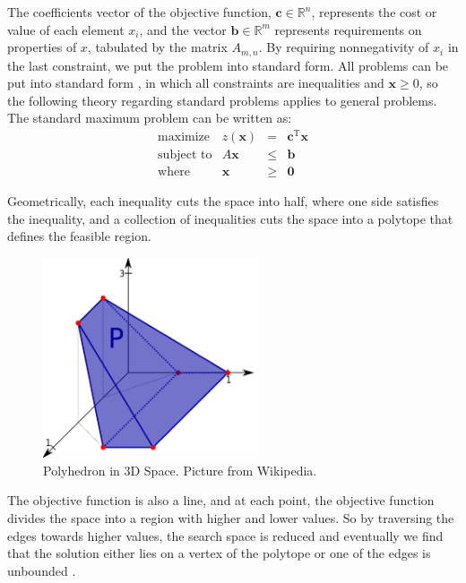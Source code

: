\documentclass[12pt]{article}
\begin{document}
The coefficients vector of the objective function, $\mathbf{c} \in \mathbb{R}^n$, represents the cost or value of each element $x_i$, and the vector $\mathbf{b} \in \mathbb{R}^m$ represents requirements on properties of $x$, tabulated by the matrix $A_{m,n}$. By requiring nonnegativity of $x_i$ in the last constraint, we put the problem into standard form. All problems can be put into standard form \cite{ferguson}, in which all constraints are inequalities and $\mathbf{x}\geq0$, so the following theory regarding standard problems applies to general problems. The standard maximum problem can be written as:
\begin{equation} \label{eq:maxprob}
    \begin{array}{rrcl}
        \text{maximize} & z(\mathbf{x}) & = & \mathbf{c}^\text{T} \mathbf{x} \\
        \text{subject\ to} & A \mathbf{x} & \leq & \mathbf{b} \\
        \text{where} & \mathbf{x} & \geq & \mathbf{0}
    \end{array}
\end{equation}

Geometrically, each inequality cuts the space into half, where one side satisfies the inequality, and a collection of inequalities cuts the space into a polytope that defines the feasible region.

\begin{figure}[H]
\centering
    \includegraphics[width=2.5in]{3dpoly}
    \caption{Polyhedron in 3D Space. Picture from Wikipedia.}
\end{figure}

The objective function is also a line, and at each point, the objective function divides the space into a region with higher and lower values. So by traversing the edges towards higher values, the search space is reduced and eventually we find that the solution either lies on a vertex of the polytope or one of the edges is unbounded \cite{murty}. 
\end{document}
